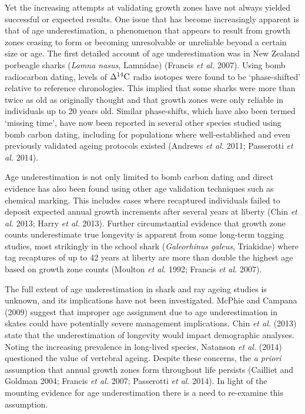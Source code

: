 \documentclass[]{article}
\begin{document}
Yet the increasing attempts at validating growth zones have not always
yielded successful or expected results. One issue that has become
increasingly apparent is that of age underestimation, a phenomenon that
appears to result from growth zones ceasing to form or becoming
unresolvable or unreliable beyond a certain size or age. The first
detailed account of age underestimation was in New Zealand porbeagle
sharks (\emph{Lamna nasus}, Lamnidae) (Francis \emph{et al.} 2007).
Using bomb radiocarbon dating, levels of \(\Delta^{14}\textup{C}\) radio
isotopes were found to be `phase-shifted' relative to reference
chronologies. This implied that some sharks were more than twice as old
as originally thought and that growth zones were only reliable in
individuals up to 20 years old. Similar phase-shifts, which have also
been termed `missing time', have now been reported in several other
species studied using bomb carbon dating, including for populations
where well-established and even previously validated ageing protocols
existed (Andrews \emph{et al.} 2011; Passerotti \emph{et al.} 2014).

Age underestimation is not only limited to bomb carbon dating and direct
evidence has also been found using other age validation techniques such
as chemical marking. This includes cases where recaptured individuals
failed to deposit expected annual growth increments after several years
at liberty (Chin \emph{et al.} 2013; Harry \emph{et al.} 2013). Further
circumstantial evidence that growth zone counts underestimate true
longevity is apparent from some long-term tagging studies, most
strikingly in the school shark (\emph{Galeorhinus galeus}, Triakidae)
where tag recaptures of up to 42 years at liberty are more than double
the highest age based on growth zone counts (Moulton \emph{et al.} 1992;
Francis \emph{et al.} 2007).

The full extent of age underestimation in shark and ray ageing studies
is unknown, and its implications have not been investigated. McPhie and
Campana (2009) suggest that improper age assignment due to age
underestimation in skates could have potentially severe management
implications. Chin \emph{et al.} (2013) state that the underestimation
of longevity would impact demographic analyses. Noting the increasing
prevalence in long-lived species, Natanson \emph{et al.} (2014)
questioned the value of vertebral ageing. Despite these concerns, the
\emph{a priori} assumption that annual growth zones form throughout life
persists (Cailliet and Goldman 2004; Francis \emph{et al.} 2007;
Passerotti \emph{et al.} 2014). In light of the mounting evidence for
age underestimation there is a need to re-examine this assumption.
\end{document}
